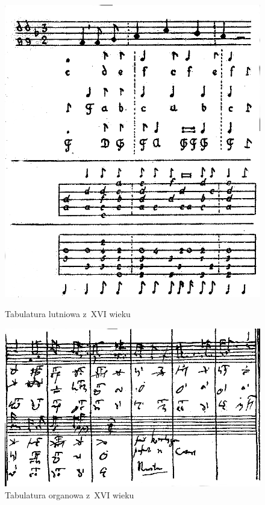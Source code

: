 \documentclass[polish,thesis,12pt]{dcsbook}
\begin{document}
\begin{figure}[H]
  \centering
  \begin{minipage}[t]{0.45\linewidth}
    \includegraphics[scale=1.25,bb=0 0 157 179]{img/tabulatura lutniowa XVI wiek.png}
    \caption{Tabulatura lutniowa z~XVI wieku~\cite{PodstawoweWiadomosci}}
    \label{tab_lutnia}
  \end{minipage}
  \quad
  \begin{minipage}[t]{0.45\linewidth}
    \includegraphics[scale=1.25,bb=0 0 191 118]{img/tabulatura organowa XVI wiek.png}
    \caption{Tabulatura organowa z~XVI wieku~\cite{PodstawoweWiadomosci}}
    \label{tab_organy}
  \end{minipage}
\end{figure}
\end{document}
